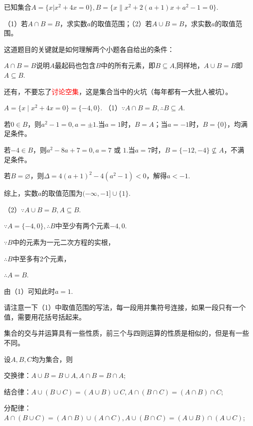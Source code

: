 \documentclass[lang=cn,math=cm,chinesefont=nofont,11pt,scheme=chinese,onecol]{elegantbook}
\begin{document}
\begin{example}
  已知集合$A=\{x|x^{2}+4x=0\},B=\{x\|x^{2}+2(a+1)x+a^{2}-1=0\}.$

  （1）若$A\cap B=B$，求实数$a$的取值范围；（2）若$A\cup B=B$，求实数$a$的取值范围。
\end{example}
\begin{remark}
  这道题目的关键就是如何理解两个小题各自给出的条件：

  $A\cap B=B$说明$A$最起码也包含$B$中的所有元素，即$B\subseteq A$,同样地，$A\cup B=B$即$A\subseteq B$.

  还有，不要忘了\textcolor{red}{讨论空集}，这是集合当中的火坑（每年都有一大批人被坑）。
\end{remark}
\begin{solution}
  $A=\{x\mid x^{2}+4x=0\}=\{-4,0\}.$
  （1）$\because A\cap B=B,$\enspace$\therefore B\subseteq A.$
  
  若$0\in B$，则$a^2-1=0,a=\pm 1.$当$a=1$时，$B=A$；当$a=-1$时，$B=\{0\}$，均满足条件。

  若$-4\in B$，则$a^2-8a+7=0,a=7\text{ 或 }1.$当$a=7$时，$B=\{-12,-4\}\nsubseteq A$，不满足条件。

  若$B=\varnothing$，则$\Delta=4(a+1)^{2}-4(a^{2}-1)<0$，解得$a<-1$.

  综上，实数$a$的取值范围为$(-\infty,-1]\cup\{1\}.$

  （2）$\because A\cup B=B,$\enspace$A\subseteq B.$

  $\because A=\{-4,0\},$\enspace$\therefore B$中至少有两个元素$-4,0.$

  $\because B$中的元素为一元二次方程的实根，

  $\therefore B$中至多有2个元素，

  $\therefore A=B.$

  由（1）可知此时$a=1$.
\end{solution}
\begin{remark}
  请注意一下（1）中取值范围的写法，每一段用并集符号连接，如果一段只有一个值，需要用花括号括起来。
\end{remark}

\hspace*{\fill}

集合的交与并运算具有一些性质，前三个与四则运算的性质是相似的，但是有一些不同。

设$A,B,C$均为集合，则
\begin{property}
  交换律：$A\cup B=B\cup A,A\cap B=B\cap A$;
\end{property}
\begin{property}
  结合律：$A\cup(B\cup C)=(A\cup B)\cup C,A\cap(B\cap C)=(A\cap B)\cap C$;
\end{property}
\begin{property}
  分配律：$A\cap(B\cup C)=(A\cap B)\cup(A\cap C),A\cup(B\cap C)=(A\cup B)\cap(A\cup C)$;
\end{property}
\end{document}
